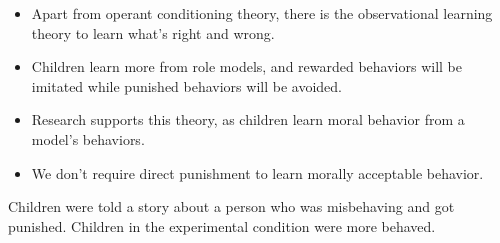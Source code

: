\documentclass[../main/main.tex]{subfiles}
\begin{document}
\begin{itemize}
        \item Apart from operant conditioning theory, there is the observational learning theory to learn what's right and wrong.  
\item Children learn more from role models, and rewarded behaviors will be imitated while punished behaviors will be avoided.
        \item Research supports this theory, as children learn moral behavior from a model's behaviors.
        \item We don't require direct punishment to learn morally acceptable behavior.
\end{itemize}
\begin{example}
Children were told a story about a person who was misbehaving and got punished. Children in the experimental condition were more behaved.
\end{example}
\end{document}
